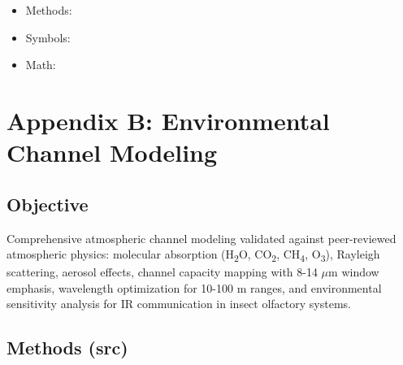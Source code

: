 \documentclass[
  13pt,
  a4paperpaper,
  12pt]{article}
\providecommand{\tightlist}{%
  \setlength{\itemsep}{0pt}\setlength{\parskip}{0pt}}
\let\oldsection\section
\renewcommand{\section}{\clearpage\oldsection}
\begin{document}
\begin{itemize}
\tightlist
\item
  Methods: 
\item
  Symbols: 
\item
  Math: 
\end{itemize}

\section{Appendix B: Environmental Channel
Modeling}\label{sec:app_environmental_channel}

\subsection{Objective}\label{objective-1}

Comprehensive atmospheric channel modeling validated against
peer-reviewed atmospheric physics: molecular absorption
(H\textsubscript{2}O, CO\textsubscript{2}, CH\textsubscript{4},
O\textsubscript{3}), Rayleigh scattering, aerosol effects, channel
capacity mapping with 8-14 \(\mu\mathrm{m}\) window emphasis, wavelength
optimization for 10-100 m ranges, and environmental sensitivity analysis
for IR communication in insect olfactory systems.

\subsection{Methods (src)}\label{methods-src-1}
\end{document}
